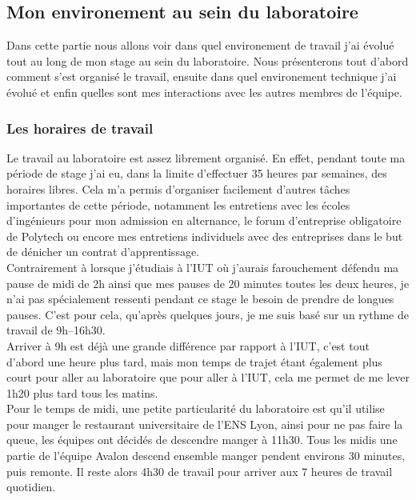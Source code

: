 \subsection{Mon environement au sein du laboratoire}
Dans cette partie nous allons voir dans quel environement de travail j'ai évolué tout au long de mon stage au sein du laboratoire. Nous présenterons tout d'abord comment s'est organisé le travail, ensuite dans quel environement technique j'ai évolué et enfin quelles sont mes interactions avec les autres membres de l'équipe.

\subsubsection{Les horaires de travail}
Le travail au laboratoire est assez librement organisé. En effet, pendant toute ma période de stage j'ai eu, dans la limite d'effectuer 35 heures par semaines, des horaires libres. Cela m'a permis d'organiser facilement d'autres tâches importantes de cette période, notamment les entretiens avec les écoles d'ingénieurs pour mon admission en alternance, le forum d'entreprise obligatoire de Polytech ou encore mes entretiens individuels avec des entreprises dans le but de dénicher un contrat d'apprentissage.\\

Contrairement à lorsque j'étudiais à l'IUT où j'aurais farouchement défendu ma pause de midi de 2h ainsi que mes pauses de 20 minutes toutes les deux heures, je n'ai pas spécialement ressenti pendant ce stage le besoin de prendre de longues pauses. C'est pour cela, qu'après quelques jours, je me suis basé sur un rythme de travail de 9h--16h30.\\

Arriver à 9h est déjà une grande différence par rapport à l'IUT, c'est tout d'abord une heure plus tard, mais mon temps de trajet étant également plus court pour aller au laboratoire que pour aller à l'IUT, cela me permet de me lever 1h20 plus tard tous les matins.\\

Pour le temps de midi, une petite particularité du laboratoire est qu'il utilise pour manger le restaurant universitaire de l'ENS Lyon, ainsi pour ne pas faire la queue, les équipes ont décidés de descendre manger à 11h30. Tous les midis une partie de l'équipe Avalon descend ensemble manger pendent environs 30 minutes, puis remonte. Il reste alors 4h30 de travail pour arriver aux 7 heures de travail quotidien.\\

